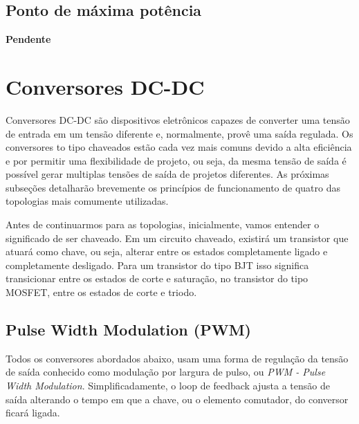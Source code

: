 \subsection*{Ponto de máxima potência}

\textbf{Pendente}

\section{Conversores DC-DC}\label{converters_revision}
Conversores DC-DC são dispositivos eletrônicos capazes de converter uma tensão de entrada em um tensão diferente e, normalmente, provê uma saída regulada. Os conversores to tipo chaveados estão cada vez mais comuns devido a alta eficiência e por permitir uma flexibilidade de projeto, ou seja, da mesma tensão de saída é possível gerar multiplas tensões de saída de projetos diferentes. As próximas subseções detalharão brevemente os princípios de funcionamento de quatro das topologias mais comumente utilizadas.


Antes de continuarmos para as topologias, inicialmente, vamos entender o significado de ser chaveado. Em um circuito chaveado, existirá um transistor que atuará como chave, ou seja, alterar entre os estados completamente ligado e completamente desligado. Para um transistor do tipo BJT isso significa transicionar entre os estados de corte e saturação, no transistor do tipo MOSFET, entre os estados de corte e triodo. 

\subsection{Pulse Width Modulation (PWM)}
Todos os conversores abordados abaixo, usam uma forma de regulação da tensão de saída conhecido como modulação por largura de pulso, ou \textit{PWM - Pulse Width Modulation}. Simplificadamente, o loop de feedback ajusta a tensão de saída alterando o tempo em que a chave, ou o elemento comutador, do conversor ficará ligada.

\noindent
\begin{minipage}{\linewidth}
\label{PWM_sample_fig}
\end{minipage}

